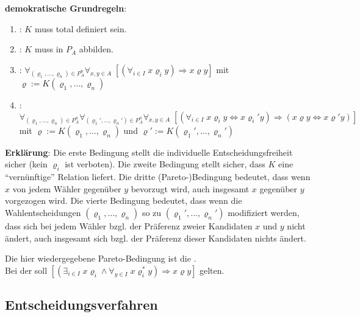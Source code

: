\textbf{demokratische Grundregeln}:
\begin{enumerate}
    \item
    :
    $K$ muss total definiert sein.
    
    \item
    :
    $K$ muss in $P_A$ abbilden.
    
    \item
    :
    $\forall_{(\varrho_1, \dotsc, \varrho_n) \in P_A^n}
    \forall_{x, y \in A}\;
    [(\forall_{i \in I}\; x \varrho_i y) \Rightarrow x \varrho y]$
    mit $\varrho := K(\varrho_1, \dotsc, \varrho_n)$
    
    \item
    :\\
    $\forall_{(\varrho_1, \dotsc, \varrho_n) \in P_A^n}
    \forall_{(\varrho_1', \dotsc, \varrho_n') \in P_A^n}
    \forall_{x, y \in A}\;
    [(\forall_{i \in I}\; x \varrho_i y \Leftrightarrow x \varrho_i' y) \Rightarrow
    (x \varrho y \Leftrightarrow x \varrho' y)]$\\
    mit $\varrho := K(\varrho_1, \dotsc, \varrho_n)$
    und $\varrho' := K(\varrho_1', \dotsc, \varrho_n')$
\end{enumerate}

\textbf{Erklärung}:
Die erste Bedingung stellt die individuelle Entscheidungsfreiheit sicher
(kein $\varrho_i$ ist verboten).
Die zweite Bedingung stellt sicher, dass $K$ eine "`vernünftige"' Relation liefert.
Die dritte (Pareto-)Bedingung bedeutet, dass wenn $x$ von jedem Wähler gegenüber $y$
bevorzugt wird, auch insgesamt $x$ gegenüber $y$ vorgezogen wird.
Die vierte Bedingung bedeutet, dass wenn die Wahlentscheidungen $(\varrho_1, \dotsc, \varrho_n)$
so zu $(\varrho_1', \dotsc, \varrho_n')$ modifiziert werden, dass sich bei jedem Wähler
bzgl. der Präferenz zweier Kandidaten $x$ und $y$ nicht ändert, auch insgesamt sich bzgl. der
Präferenz dieser Kandidaten nichts ändert.

Die hier wiedergegebene Pareto-Bedingung ist die .\\
Bei der  soll
$[(\exists_{i \in I}\; x \varrho_i  \land \forall_{y \in I}\; x \varrho_i^\ast y)
\Rightarrow x \varrho y]$ gelten.

\pagebreak

\subsection{%
    Entscheidungsverfahren%
}

